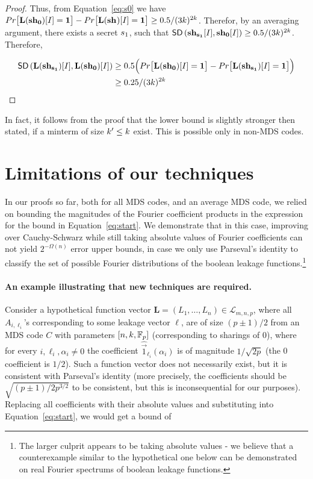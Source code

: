 \begin{proof}
Thus, from Equation~\ref{eq:s0} we have $Pr\big[\mathbf{L}(\mathbf{sh_{0}})[I]=\mathbf{1}\big]-Pr\big[\mathbf{L}(\mathbf{sh_{}})[I]=\mathbf{1}\big]\geq 0.5/(3k)^{2k}$. 
Therefor, by an averaging argument, there exists a secret $s_1$, such that 
$\mathsf{SD} \left({\mathbf{sh_{s_1}}[I]},{\mathbf{sh_{0}}[I]} \right)\geq 0.5/(3k)^{2k}$. Therefore, 

\begin{align}
\mathsf{SD} \left({\mathbf{L}(\mathbf{sh_{s_1}})[I]},{\mathbf{L}(\mathbf{sh_{0}})[I]} \right) &\geq 0.5\Big(Pr\big[\mathbf{L}(\mathbf{sh_{0}})[I]=
\mathbf{1}\big]-Pr\big[\mathbf{L}(\mathbf{sh_{s_1}})[I]=\mathbf{1}\big]\Big) \nonumber \\
& \geq 0.25/(3k)^{2k} \nonumber
\end{align}\end{proof}


\begin{remark}
In fact, it follows from the proof that the lower bound is slightly stronger then stated, 
if a minterm of size $k'\leq k$ exist. This is possible only in non-MDS codes. 
\end{remark}

\section{Limitations of our techniques}\label{sec:lim}

In our proofs so far, both for all MDS codes, and an average MDS code, we relied on bounding the magnitudes of the Fourier coefficient products in the expression for the bound in Equation~\ref{eq:start}.
We demonstrate that in this case, improving over Cauchy-Schwarz while still taking absolute values of Fourier coefficients can not yield $2^{-\Omega(n)}$ error upper bounds, in case we only use Parseval's identity to classify the set of possible Fourier distributions of the boolean leakage functions.\footnote{The larger culprit appears to be taking absolute values - we believe that a counterexample similar to the hypothetical one below can be demonstrated on real Fourier spectrums of boolean leakage functions.} 

\paragraph{An example illustrating that new techniques are required.}
Consider a hypothetical function vector $\mathbf{L}=(L_1,\ldots,L_n) \in {\mathcal L}_{m,n,p}$, where all
$A_{i,\ell_i}$'s corresponding to some leakage vector $\ell$, are of size $(p\pm 1)/2$ from an MDS code $C$ with parameters $[n,k,\mathbb{F}_p]$ (corresponding to sharings of 0), where for every $i,\ell_i,\alpha_i\neq 0$ the coefficient $\widehat{\vec{1}}_{\ell_i}(\alpha_i)$ is of magnitude $1/\sqrt{2p}$ (the 0 coefficient is $1/2$). 
Such a function vector does not necessarily exist, but
it is consistent with Parseval's identity (more precisely, the coefficients should be $\sqrt{(p\pm 1)/2p^{3/2}}$ to be consistent, but this is inconsequential for our purposes).
Replacing all coefficients with their absolute values and substituting into 
Equation~\ref{eq:start}, we would get a bound of 

